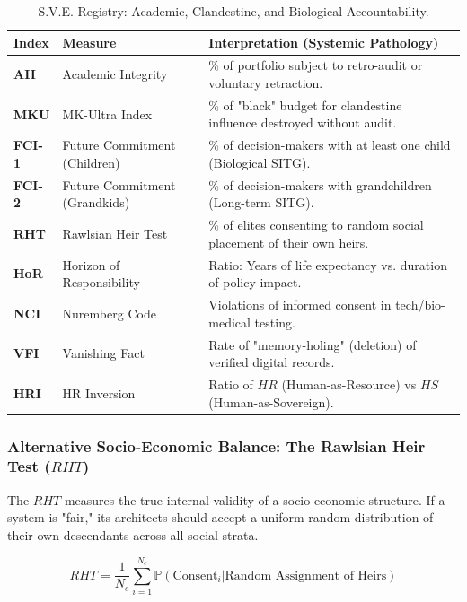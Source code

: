 \documentclass[11pt,a4paper]{article}
\theoremstyle{definition}
\theoremstyle{remark}
\begin{document}
\begin{table}[h!]
\centering
\small
\begin{tabular}{|l|l|l|}
\hline
\textbf{Index} & \textbf{Measure} & \textbf{Interpretation (Systemic Pathology)} \\ \hline
\textbf{AII} & Academic Integrity & \% of portfolio subject to retro-audit or voluntary retraction. \\ \hline
\textbf{MKU} & MK-Ultra Index & \% of "black" budget for clandestine influence destroyed without audit. \\ \hline
\textbf{FCI-1} & Future Commitment (Children) & \% of decision-makers with at least one child (Biological SITG). \\ \hline
\textbf{FCI-2} & Future Commitment (Grandkids) & \% of decision-makers with grandchildren (Long-term SITG). \\ \hline
\textbf{RHT} & Rawlsian Heir Test & \% of elites consenting to random social placement of their own heirs. \\ \hline
\textbf{HoR} & Horizon of Responsibility & Ratio: Years of life expectancy vs. duration of policy impact. \\ \hline
\textbf{NCI} & Nuremberg Code & Violations of informed consent in tech/bio-medical testing. \\ \hline
\textbf{VFI} & Vanishing Fact & Rate of "memory-holing" (deletion) of verified digital records. \\ \hline
\textbf{HRI} & HR Inversion & Ratio of $HR$ (Human-as-Resource) vs $HS$ (Human-as-Sovereign). \\ \hline
\end{tabular}
\caption{S.V.E. Registry: Academic, Clandestine, and Biological Accountability.}
\end{table}

\subsubsection*{Alternative Socio-Economic Balance: The Rawlsian Heir Test ($RHT$)}

The $RHT$ measures the true internal validity of a socio-economic structure. If a system is "fair," its architects should accept a uniform random distribution of their own descendants across all social strata.

\begin{equation}
RHT = \frac{1}{N_{e}} \sum_{i=1}^{N_{e}} \mathbb{P}(\text{Consent}_i | \text{Random Assignment of Heirs})
\end{equation}
\end{document}
